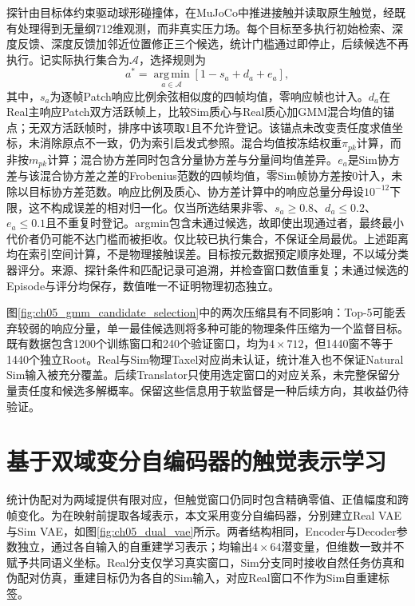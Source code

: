 探针由目标体约束驱动球形碰撞体，在MuJoCo中推进接触并读取原生触觉，经既有处理得到无量纲712维观测，而非真实压力场。每个目标至多执行初始检索、深度反馈、深度反馈加邻近位置修正三个候选，统计门槛通过即停止，后续候选不再执行。记实际执行集合为$\mathcal A$，选择规则为
\begin{equation}
 a^*=\operatorname*{arg\,min}_{a\in\mathcal A}
 \left[1-s_a+d_a+e_a\right],
 \label{eq:ch05_pair_selection}
\end{equation}
其中，$s_a$为逐帧Patch响应比例余弦相似度的四帧均值，零响应帧也计入。$d_a$在Real主响应Patch双方活跃帧上，比较Sim质心与Real质心加GMM混合均值的锚点；无双方活跃帧时，排序中该项取1且不允许登记。该锚点未改变责任度求值坐标，未消除原点不一致，仍为索引启发式参照。混合均值按冻结权重$\pi_{pk}$计算，而非按$m_{pk}$计算；混合协方差同时包含分量协方差与分量间均值差异。$e_a$是Sim协方差与该混合协方差之差的Frobenius范数的四帧均值，零Sim帧协方差按0计入，未除以目标协方差范数。响应比例及质心、协方差计算中的响应总量分母设$10^{-12}$下限，这不构成误差的相对归一化。仅当所选结果非零、$s_a\ge0.8$、$d_a\le0.2$、$e_a\le0.1$且不重复时登记。argmin包含未通过候选，故即使出现通过者，最终最小代价者仍可能不达门槛而被拒收。仅比较已执行集合，不保证全局最优。上述距离均在索引空间计算，不是物理接触误差。目标按元数据预定顺序处理，不以域分类器评分。来源、探针条件和匹配记录可追溯，并检查窗口数值重复；未通过候选的Episode与评分均保存，数值唯一不证明物理初态独立。

图\ref{fig:ch05_gmm_candidate_selection}中的两次压缩具有不同影响：Top-5可能丢弃较弱的响应分量，单一最佳候选则将多种可能的物理条件压缩为一个监督目标。既有数据包含1200个训练窗口和240个验证窗口，均为$4\times712$，但1440窗不等于1440个独立Root。Real与Sim物理Taxel对应尚未认证，统计准入也不保证Natural Sim输入被充分覆盖。后续Translator只使用选定窗口的对应关系，未完整保留分量责任度和候选多解概率。保留这些信息用于软监督是一种后续方向，其收益仍待验证。



\section{基于双域变分自编码器的触觉表示学习}
\label{sec:ch05_dual_vae_representation}

统计伪配对为两域提供有限对应，但触觉窗口仍同时包含精确零值、正值幅度和跨帧变化。为在映射前提取各域表示，本文采用变分自编码器\cite{kingma2014vae}，分别建立Real VAE与Sim VAE，如图\ref{fig:ch05_dual_vae}所示。两者结构相同，Encoder与Decoder参数独立，通过各自输入的自重建学习表示；均输出$4\times64$潜变量，但维数一致并不赋予共同语义坐标。Real分支仅学习真实窗口，Sim分支同时接收自然任务仿真和伪配对仿真，重建目标仍为各自的Sim输入，对应Real窗口不作为Sim自重建标签。

